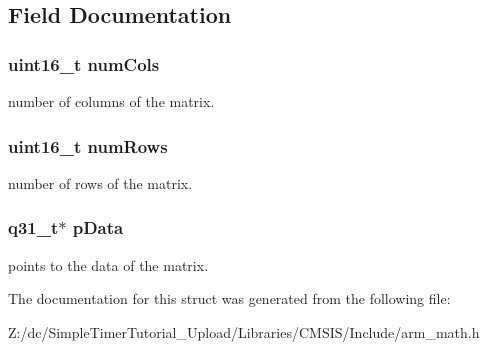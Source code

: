 \subsection{Field Documentation}
\hypertarget{structarm__matrix__instance__q31_a4bb5ec0d13eb4c9cf887aa8366a44117}{
\subsubsection[{num\-Cols}]{\setlength{\rightskip}{0pt plus 5cm}uint16\-\_\-t num\-Cols}}\label{structarm__matrix__instance__q31_a4bb5ec0d13eb4c9cf887aa8366a44117}
number of columns of the matrix. \hypertarget{structarm__matrix__instance__q31_a1bcf80ccdc2acc29198f1592ae300390}{
\subsubsection[{num\-Rows}]{\setlength{\rightskip}{0pt plus 5cm}uint16\-\_\-t num\-Rows}}\label{structarm__matrix__instance__q31_a1bcf80ccdc2acc29198f1592ae300390}
number of rows of the matrix. \hypertarget{structarm__matrix__instance__q31_ad296f76577326ff280726323536eed6d}{
\subsubsection[{p\-Data}]{\setlength{\rightskip}{0pt plus 5cm}q31\-\_\-t$\ast$ p\-Data}}\label{structarm__matrix__instance__q31_ad296f76577326ff280726323536eed6d}
points to the data of the matrix. 

The documentation for this struct was generated from the following file\-:\begin{DoxyCompactItemize}
\item 
Z\-:/dc/\-Simple\-Timer\-Tutorial\-\_\-\-Upload/\-Libraries/\-C\-M\-S\-I\-S/\-Include/arm\-\_\-math.\-h\end{DoxyCompactItemize}
